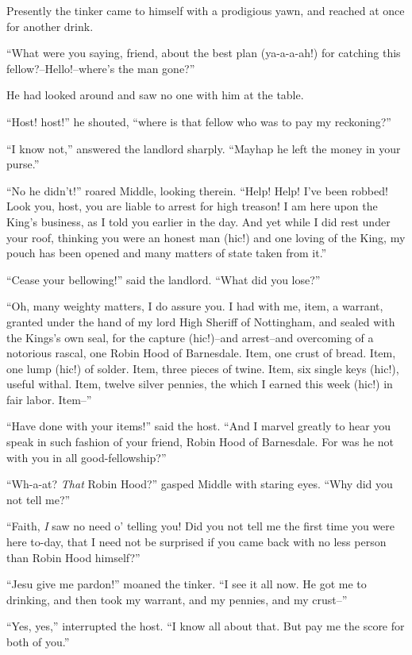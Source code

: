 Presently the tinker came to himself with a prodigious yawn, and reached
at once for another drink.

``What were you saying, friend, about the best plan (ya-a-a-ah!) for
catching this fellow?--Hello!--where's the man gone?''

He had looked around and saw no one with him at the table.

``Host! host!'' he shouted, ``where is that fellow who was to pay my
reckoning?''

``I know not,'' answered the landlord sharply. ``Mayhap he left the
money in your purse.''

``No he didn't!'' roared Middle, looking therein. ``Help! Help! I've
been robbed! Look you, host, you are liable to arrest for high treason!
I am here upon the King's business, as I told you earlier in the day.
And yet while I did rest under your roof, thinking you were an honest
man (hic!) and one loving of the King, my pouch has been opened and many
matters of state taken from it.''

``Cease your bellowing!'' said the landlord. ``What did you lose?''

``Oh, many weighty matters, I do assure you. I had with me, item, a
warrant, granted under the hand of my lord High Sheriff of Nottingham,
and sealed with the Kings's own seal, for the capture (hic!)--and
arrest--and overcoming of a notorious rascal, one Robin Hood of
Barnesdale. Item, one crust of bread. Item, one lump (hic!) of solder.
Item, three pieces of twine. Item, six single keys (hic!), useful
withal. Item, twelve silver pennies, the which I earned this week (hic!)
in fair labor. Item--''

``Have done with your items!'' said the host. ``And I marvel greatly to
hear you speak in such fashion of your friend, Robin Hood of Barnesdale.
For was he not with you in all good-fellowship?''

``Wh-a-at? \emph{That} Robin Hood?'' gasped Middle with staring eyes.
``Why did you not tell me?''

``Faith, \emph{I} saw no need o' telling you! Did you not tell me the
first time you were here to-day, that I need not be surprised if you
came back with no less person than Robin Hood himself?''

``Jesu give me pardon!'' moaned the tinker. ``I see it all now. He got
me to drinking, and then took my warrant, and my pennies, and my
crust--''

``Yes, yes,'' interrupted the host. ``I know all about that. But pay me
the score for both of you.''

